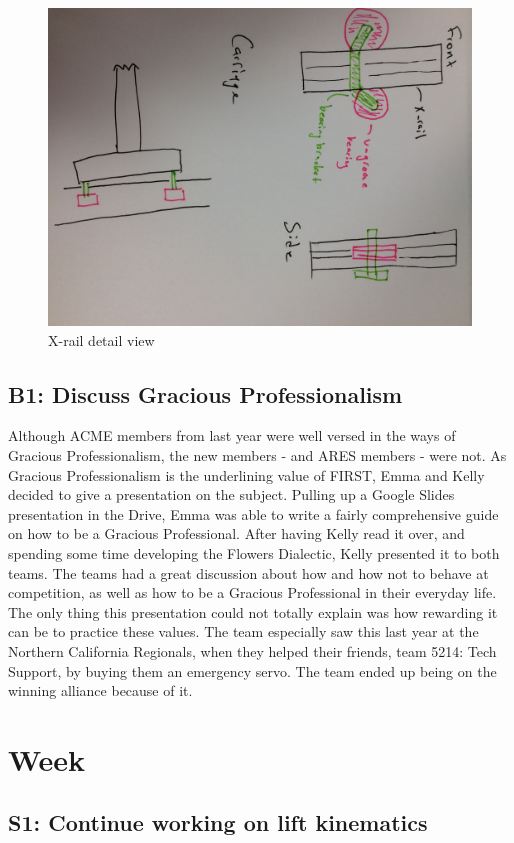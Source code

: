 \documentclass{article}
\begin{document}
 \begin{figure}
     \centering
     \includegraphics[width=.6\textwidth]{05_10-01/images/xrail.jpg}
     \caption{X-rail detail view}
     \label{fig:my_label}
 \end{figure}
\subsection{B1: Discuss Gracious Professionalism}

Although ACME members from last year were well versed in the ways of Gracious Professionalism, the new members - and ARES members - were not. As Gracious Professionalism is the underlining value of FIRST, Emma and Kelly decided to give a presentation on the subject. Pulling up a Google Slides presentation in the Drive, Emma was able to write a fairly comprehensive guide on how to be a Gracious Professional. After having Kelly read it over, and spending some time developing the Flowers Dialectic, Kelly presented it to both teams. The teams had a great discussion about how and how not to behave at competition, as well as how to be a Gracious Professional in their everyday life. The only thing this presentation could not totally explain was how rewarding it can be to practice these values. The team especially saw this last year at the Northern California Regionals, when they helped their friends, team 5214: Tech Support, by buying them an emergency servo. The team ended up being on the winning alliance because of it.  
\clearpage \newpage \section{Week \thesection} 
\subsection{S1: Continue working on lift kinematics}
\end{document}
